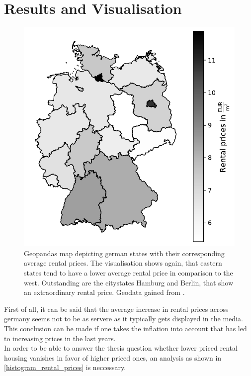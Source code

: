 \documentclass{article}
\begin{document}
\section{Results and Visualisation}
	\label{results}
			\begin{figure}
		\centering
		\includegraphics[width=0.9\linewidth]{../fig/figures/geodata_2017.pdf}
		\caption{Geopandas map depicting german states with their corresponding average rental prices. The visualisation shows again, that eastern states tend to have a lower average rental price in comparison to the west. Outstanding are the citystates Hamburg and Berlin, that show an extraordinary rental price. Geodata gained from \cite{geo_data}.}
		\label{geodata_2017}
	\end{figure}
	First of all, it can be said that the average increase in rental prices across germany seems not to be as servere as it typically gets displayed in the media. This conclusion can be made if one takes the inflation into account that has led to increasing prices in the last years. \cite{inflation} \\
	In order to be able to answer the thesis question whether lower priced rental housing vanishes in favor of higher priced ones, an analysis as shown in \cref{histogram_rental_prices} is neccessary.
	
\end{document}
